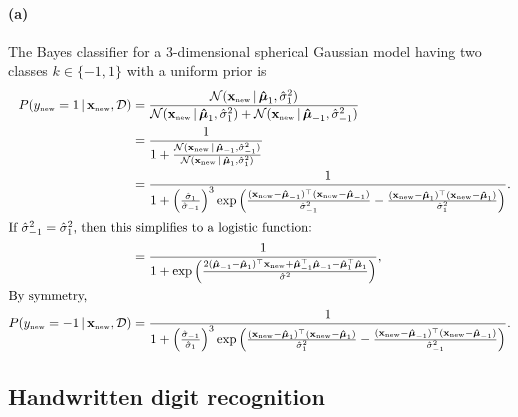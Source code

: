 \documentclass[a4paper,11pt]{article}
\DeclareMathOperator{\given}{\mid}
\begin{document}
\paragraph{(a)}
The Bayes classifier for a 3-dimensional spherical Gaussian model having two classes $k\in\{-1,1\}$ with a uniform prior is
\begin{align*}
  P( y_\mathrm{\scriptscriptstyle{new}}=1
    \given \mathbf{x}_\mathrm{\scriptscriptstyle{new}}, \mathcal{D})
  &=
  \frac{
    \mathcal{N}( \mathbf{x}_\mathrm{\scriptscriptstyle{new}}
      \given \boldsymbol{\hat\mu}_1, \hat\sigma_1^2)
  }{
    \mathcal{N}( \mathbf{x}_\mathrm{\scriptscriptstyle{new}}
      \given \boldsymbol{\hat\mu}_1, \hat\sigma_1^2)
    +
    \mathcal{N}( \mathbf{x}_\mathrm{\scriptscriptstyle{new}}
      \given \boldsymbol{\hat\mu}_{-1}, \hat\sigma_{-1}^2)
  }
  \\
  &=
  \frac{1}{
    1 + \frac{
      \mathcal{N}( \mathbf{x}_\mathrm{\scriptscriptstyle{new}}
        \given \boldsymbol{\hat\mu}_{-1}, \hat\sigma_{-1}^2)
    }{
      \mathcal{N}( \mathbf{x}_\mathrm{\scriptscriptstyle{new}}
        \given \boldsymbol{\hat\mu}_1, \hat\sigma_1^2)
    }
  }
  \\
  &=
  \frac{1}{
    1 + \left(\frac{
    \hat\sigma_1
    }{
    \hat\sigma_{-1}
    }\right)^3
    \exp\left(
      \frac{
        (\mathbf{x}_\mathrm{\scriptscriptstyle{new}}-\boldsymbol{\hat\mu}_{-1})^\top
        (\mathbf{x}_\mathrm{\scriptscriptstyle{new}}-\boldsymbol{\hat\mu}_{-1})
      }{\hat\sigma_{-1}^2}
      -\frac{
        (\mathbf{x}_\mathrm{\scriptscriptstyle{new}}-\boldsymbol{\hat\mu}_{1})^\top
        (\mathbf{x}_\mathrm{\scriptscriptstyle{new}}-\boldsymbol{\hat\mu}_{1})
      }{\hat\sigma_{1}^2}
    \right)
  }.
  \\
\intertext{If $\hat\sigma_{-1}^2=\hat\sigma_{1}^2$, then this simplifies to a logistic function:}
  &=
  \frac{1}{
    1 + \exp\left(
      \frac{
        2(\boldsymbol{\hat\mu}_{-1}-\boldsymbol{\hat\mu}_1)^\top\mathbf{x}_\mathrm{\scriptscriptstyle{new}}
        + \boldsymbol{\hat\mu}_{-1}^\top\boldsymbol{\hat\mu}_{-1}
        - \boldsymbol{\hat\mu}_{1}^\top\boldsymbol{\hat\mu}_{1}
      }{\hat\sigma^2}
    \right)
  },
  \\
\intertext{By symmetry,}
  P( y_\mathrm{\scriptscriptstyle{new}}=-1
    \given \mathbf{x}_\mathrm{\scriptscriptstyle{new}}, \mathcal{D})
  &=
  \frac{1}{
    1 + \left(\frac{
      \hat\sigma_{-1}
    }{
      \hat\sigma_{1}
    }\right)^3
  \exp\left(
    \frac{
      (\mathbf{x}_\mathrm{\scriptscriptstyle{new}}-\boldsymbol{\hat\mu}_{1})^\top
      (\mathbf{x}_\mathrm{\scriptscriptstyle{new}}-\boldsymbol{\hat\mu}_{1})
    }{\hat\sigma_{1}^2}
    -\frac{
      (\mathbf{x}_\mathrm{\scriptscriptstyle{new}}-\boldsymbol{\hat\mu}_{-1})^\top
      (\mathbf{x}_\mathrm{\scriptscriptstyle{new}}-\boldsymbol{\hat\mu}_{-1})
    }{\hat\sigma_{-1}^2}
  \right)
}.
\end{align*}

\subsection{Handwritten digit recognition}
\end{document}
